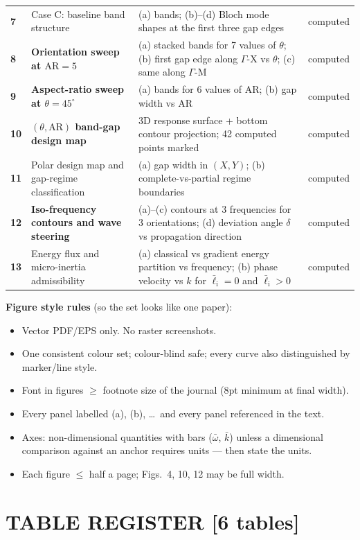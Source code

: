 \documentclass[11pt,a4paper]{article}
\newcommand{\bp}[1]{\textcolor{accent}{\textsf{\footnotesize [#1]}}}
\begin{document}
\begin{xltabular}{\textwidth}{@{}>{\bfseries}p{1.05cm} L{4.15cm} Y L{2.15cm}@{}}
7 & Case C: baseline band structure & (a) bands; (b)--(d) Bloch mode shapes at the first three gap edges & computed \\
8 & \textbf{Orientation sweep at $\mathrm{AR}=5$} & (a) stacked bands for 7 values of $\theta$; (b) first gap edge along $\Gamma$-X vs $\theta$; (c) same along $\Gamma$-M & computed \\
9 & \textbf{Aspect-ratio sweep at $\theta=45^\circ$} & (a) bands for 6 values of AR; (b) gap width vs AR & computed \\
10 & \textbf{$(\theta,\mathrm{AR})$ band-gap design map} & 3D response surface + bottom contour projection; 42 computed points marked & computed \\
11 & Polar design map and gap-regime classification & (a) gap width in $(X,Y)$; (b) complete-vs-partial regime boundaries & computed \\
12 & \textbf{Iso-frequency contours and wave steering} & (a)--(c) contours at 3 frequencies for 3 orientations; (d) deviation angle $\delta$ vs propagation direction & computed \\
13 & Energy flux and micro-inertia admissibility & (a) classical vs gradient energy partition vs frequency; (b) phase velocity vs $k$ for $\bar\ell_{\mathrm i}=0$ and $\bar\ell_{\mathrm i}>0$ & computed \\
\bottomrule
\end{xltabular}

\textbf{Figure style rules} (so the set looks like one paper):
\begin{itemize}
\item Vector PDF/EPS only. No raster screenshots.
\item One consistent colour set; colour-blind safe; every curve also distinguished by marker/line style.
\item Font in figures $\ge$ footnote size of the journal (8pt minimum at final width).
\item Every panel labelled (a), (b), \ldots\ and every panel referenced in the text.
\item Axes: non-dimensional quantities with bars ($\bar\omega$, $\bar k$) unless a dimensional comparison against an anchor requires units --- then state the units.
\item Each figure $\le$ half a page; Figs.~4, 10, 12 may be full width.
\end{itemize}

\section{TABLE REGISTER \bp{6 tables}}
\label{sec:tables}
\end{document}
